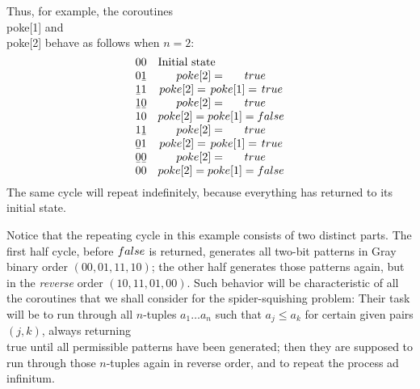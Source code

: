 Thus, for example, the coroutines \\{poke}[1] and \\{poke}[2] behave as
follows when $n=2$:
$$\vbox{\halign{#\quad&#\hfil\cr
     00&Initial state\cr
   0\b1&$\\{poke}[2]=\\{true}$\cr
   \b11&$\\{poke}[2]=\\{poke}[1]=\\{true}$\cr
 \b1\b0&$\\{poke}[2]=\\{true}$\cr
     10&$\\{poke}[2]=\\{poke}[1]=\\{false}$\cr
   1\b1&$\\{poke}[2]=\\{true}$\cr
   \b01&$\\{poke}[2]=\\{poke}[1]=\\{true}$\cr
 \b0\b0&$\\{poke}[2]=\\{true}$\cr
     00&$\\{poke}[2]=\\{poke}[1]=\\{false}$\cr}}$$
The same cycle will repeat indefinitely, because
everything has returned to its initial state.

Notice that the repeating cycle in this example consists of
two distinct parts. The first half cycle, before $\\{false}$
is returned, generates all two-bit patterns in Gray binary
order $(00,01,11,10)$; the other half generates those
patterns again, but in the {\it reverse\/} order $(10,11,01,00)$.
Such behavior will be characteristic of all the coroutines that we
shall consider for the spider-squishing problem: Their task
will be to run through all $n$-tuples $a_1\ldots a_n$ such
that $a_j \leq a_k$ for certain given pairs $(j,k)$, always
returning \\{true} until all permissible patterns have been generated;
then they are supposed to run through those $n$-tuples again
in reverse order, and to repeat the process ad infinitum. 

